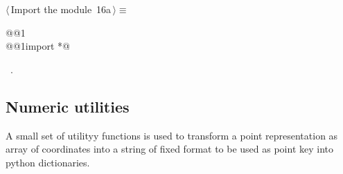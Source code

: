 \documentclass[11pt,oneside]{article}	%
\begin{document}
\begin{flushleft} \small \label{scrap40}
\protect{}$\langle\,$Import the module\nobreak\ {\footnotesize 16a}$\,\rangle\equiv$
\vspace{-1ex}
\begin{list}{}{} \item
\mbox{}\verb@import @@1\verb@@\\
\mbox{}\verb@from @@1\verb@ import *@\\
\mbox{}\verb@@{\NWsep}
\end{list}
\vspace{-1ex}
\footnotesize\addtolength{\baselineskip}{-1ex}
\begin{list}{}{\setlength{\itemsep}{-\parsep}\setlength{\itemindent}{-\leftmargin}}
\item \NWtxtMacroRefIn\ .
\end{list}
\end{flushleft}


\subsection{Numeric utilities}

A small set of utilityy functions is used to transform a point representation as array of coordinates into a string of fixed format to be used as point key into python dictionaries.
\end{document}
